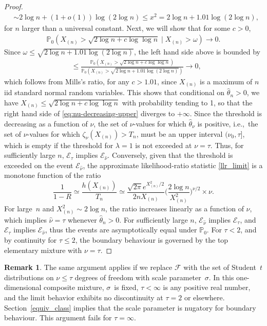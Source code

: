 \documentclass[11pt]{article}
\theoremstyle{definition}
\newtheorem{remark}{Remark}[section]
\def\Prob{{\mathbb P}}
\def\F{{\mathcal F}}
\def\Xmax{X_{(n)}}
\begin{document}
\begin{proof}
\begin{align*}
	&\sim 2\log n + (1+o(1)) \log(2\log n) \leq x^2 = 2\log n + 1.01 \log (2\log n),
	\end{align*}
	for $n$ larger than a universal constant. Next, we will show that for some $c>0$,
	\begin{align*}
	\Prob_0(X_{(n)}>\sqrt{2\log n + c\log\log n} \mid X_{(n)} > \omega) \to 0.
	\end{align*}
	Since $\omega \leq \sqrt{2\log n + 1.01\log(2\log n)}$, the left hand side above is bounded by
	\begin{align*}
	&\leq \frac{\Prob_0(X_{(n)}>\sqrt{2\log n + c\log\log n})}{\Prob_0(X_{(n)}>\sqrt{2\log n + 1.01\log(2\log n)})}\to 0,
	\end{align*}
	which follows from Mills's ratio, for any $c>1.01$, since $X_{(n)}$ is a maximum of $n$ iid standard normal random variables. This shows that conditional on $\hat{\theta}_n>0$, we have $X_{(n)} \leq \sqrt{2\log n + c \log \log n}$ with probability tending to 1, so that the right hand side of \eqref{eq:nu-decreasing-upper} diverges to $+\infty$. 
	Since the threshold is decreasing as a function of $\nu$, the set of $\nu$-values for which $\hat\theta_\nu$ is positive, i.e.,~the set of $\nu$-values for which $\zeta_\nu(\Xmax) > T_n$, must be an upper interval $(\nu_0, \tau]$, which is empty if the threshold for $\lambda=1$ is not exceeded at $\nu=\tau$. Thus, for sufficiently large $n$, $\mathcal{E}_\tau$ implies $\mathcal{E}_{\hat{\nu}}$. Conversely, given that the threshold is exceeded  on the event $\mathcal{E}_{\hat\nu}$, the approximate likelihood-ratio statistic \eqref{llr_limit} is a monotone function of the ratio
	\[
	\frac 1 {1 - R} \simeq 
	\frac{h(\Xmax)} {T_n} \simeq  \frac{\sqrt{2\pi} e^{\Xmax^2/2}} {2n\Xmax} 
	\biggl( \frac{2\log n}{\Xmax^2}\biggr)^{\nu/2} \times\nu.
	\]
	For large~$n$ and $\Xmax^2 \sim 2\log n$, the ratio increases linearly as a function of $\nu$, which implies
	$\hat\nu = \tau$ whenever $\hat\theta_n > 0$. For sufficiently large $n$, $\mathcal{E}_{\hat\nu}$ implies $\mathcal{E}_{\tau}$, and $\mathcal{E}_{\tau}$ implies $\mathcal{E}_{\hat\nu}$, thus the events are asymptotically equal under $\Prob_0$.	For $\tau < 2$, and by continuity for $\tau\le 2$, the boundary behaviour is governed by the top elementary mixture with $\nu=\tau$.
\end{proof}


\begin{remark}
	The same argument applies if we replace $\F$ with the set of Student~$t$ distributions on $\nu \le \tau$ degrees of freedom with scale parameter~$\sigma$.  In this one-dimensional composite mixture, $\sigma$~is fixed, $\tau < \infty$ is any positive real number, and the limit behavior exhibits no discontinuity at $\tau=2$ or elsewhere.
	Section~\ref{equiv_class} implies that the scale parameter is nugatory for boundary behaviour.
	This argument fails for $\tau = \infty$.
\end{remark}
\end{document}
